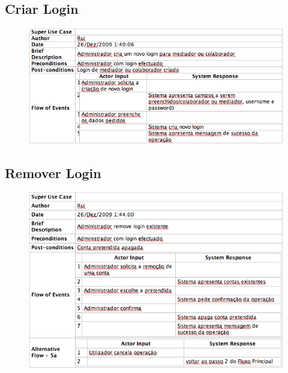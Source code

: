 \subsection{Criar Login}
\begin{figure}[!htb]
	\centering
	\includegraphics[scale=0.7]{images/Prints/RegistoUtilizadores/CriarLogin.png}
\end{figure}

\pagebreak

\subsection{Remover Login}
\begin{figure}[!htb]
	\centering
	\includegraphics[scale=0.7]{images/Prints/RegistoUtilizadores/RemoverLogin.png}
\end{figure}


